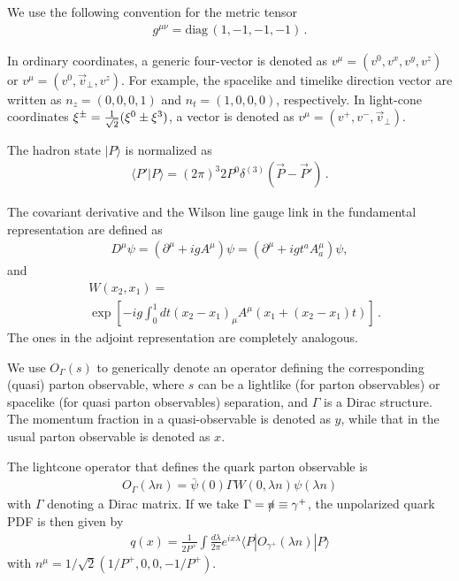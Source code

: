 \documentclass[aps,rmp,reprint,amsmath,amssymb,graphicx,longbibliography]{revtex4-1} %
\begin{document}
We use the following convention for the metric tensor
\begin{align}\label{eq:metric}
g^{\mu\nu} = \text{diag}\,(1,-1,-1,-1)\,.
\end{align}

In ordinary coordinates, a generic four-vector is denoted as $v^\mu=(v^0, v^x, v^y, v^z)$ or $v^\mu=(v^0, {\vec v}_\perp, v^z)$. For example, the spacelike and timelike direction vector are written as $n_z=(0,0,0,1)$ and $n_t=(1,0,0,0)$, respectively. In light-cone coordinates $\xi^\pm ={1\over \sqrt{2}}(\xi^0\pm \xi^3)$, a vector is denoted as $v^\mu=(v^+, v^-, {\vec v}_\perp)$.


The hadron state $|P\rangle$ is normalized as
\begin{align}\label{eq:norm}
\langle P'|P\rangle = (2\pi)^3 2P^0 \delta^{(3)}(\vec{P}-\vec{P}')\,.
\end{align}

The covariant derivative and the Wilson line gauge link in the fundamental representation are defined as
\begin{align}
D^\mu \psi=(\partial^\mu+ig A^\mu)\psi=(\partial^\mu+ig t^a A_a^\mu)\psi,
\end{align}
and
\begin{align} \label{eq:wilsonline}
&W(x_2,x_1)=\nonumber \\
&\exp\left[-ig\int_{0}^{1} dt (x_2-x_1)_\mu A^\mu(x_1+(x_2-x_1)t)\right]\,.
\end{align}
The ones in the adjoint representation are completely analogous.

We use $O_\Gamma(s)$ to generically denote an operator defining the corresponding (quasi) parton observable, where $s$ can be a lightlike (for parton observables) or spacelike (for quasi parton observables) separation, and $\Gamma$ is a Dirac structure. The momentum fraction in a quasi-observable is denoted as $y$, while that in the usual parton observable is denoted as $x$.

The lightcone operator that defines the quark parton observable is
\begin{align}
O_\Gamma(\lambda n)=\bar\psi(0)\Gamma W(0,\lambda n)\psi(\lambda n)
\end{align}
with  $\Gamma$ denoting a Dirac matrix. If we take $\Gamma=\slashed{n}\equiv \gamma^+$, the unpolarized quark PDF is then given by
\begin{align}
q(x)=\frac{1}{2P^+}\int\frac{d\lambda }{2\pi}e^{ix\lambda }\langle P|O_{\gamma^+}(\lambda n)|P\rangle
\end{align}
with $n^\mu=1/\sqrt{2}(1/P^+,0,0,-1/P^+)$.
\end{document}
